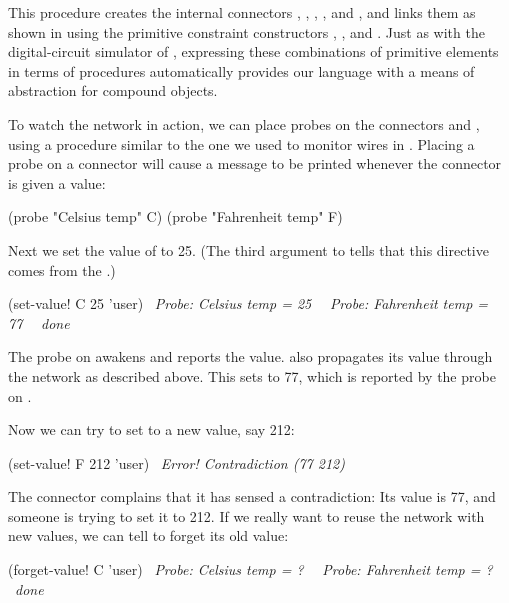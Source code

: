 \noindent
This procedure creates the internal connectors , , ,
, and , and links them as shown in  using the
primitive constraint constructors , , and
.  Just as with the digital-circuit simulator of
, expressing these combinations of primitive elements in terms of
procedures automatically provides our language with a means of abstraction for
compound objects.

To watch the network in action, we can place probes on the connectors 
and , using a  procedure similar to the one we used to
monitor wires in .  Placing a probe on a connector will
cause a message to be printed whenever the connector is given a value:

\begin{codeBlock}
(probe "Celsius temp" C)
(probe "Fahrenheit temp" F)
\end{codeBlock}

\noindent
Next we set the value of  to 25.  (The third argument to
 tells  that this directive comes from the
.)

\begin{codeBlock}
(set-value! C 25 'user)
~\textit{Probe: Celsius temp = 25}~
~\textit{Probe: Fahrenheit temp = 77}~
~\textit{done}~
\end{codeBlock}

\noindent
The probe on  awakens and reports the value.   also propagates
its value through the network as described above.  This sets  to 77,
which is reported by the probe on .

Now we can try to set  to a new value, say 212:

\begin{codeBlock}
(set-value! F 212 'user)
~\textit{Error! Contradiction (77 212)}~
\end{codeBlock}

\noindent
The connector complains that it has sensed a contradiction: Its value is 77,
and someone is trying to set it to 212.  If we really want to reuse the network
with new values, we can tell  to forget its old value:

\begin{codeBlock}
(forget-value! C 'user)
~\textit{Probe: Celsius temp = ?}~
~\textit{Probe: Fahrenheit temp = ?}~
~\textit{done}~
\end{codeBlock}

